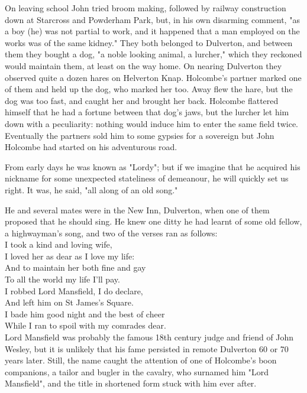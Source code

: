On leaving school John tried broom making, followed by railway construction down at Starcross and Powderham Park, but, in his own disarming comment, "as a boy (he) was not partial to work, and it happened that a man employed on the works was of the same kidney." They both belonged to Dulverton, and between them they bought a dog, "a noble looking animal, a lurcher," which they reckoned would maintain them, at least on the way home. On nearing Dulverton they observed quite a dozen hares on Helverton Knap. Holcombe's partner marked one of them and held up the dog, who marked her too. Away flew the hare, but the dog was too fast, and caught her and brought her back. Holcombe flattered himself that he had a fortune between that dog's jaws, but the lurcher let him down with a peculiarity: nothing would induce him to enter the same field twice. Eventually the partners sold him to some gypsies for a sovereign   but John Holcombe had started on his adventurous road.

From early days he was known as "Lordy"; but if we imagine that he acquired his nickname for some unexpected stateliness of demeanour, he will quickly set us right. It was, he said, "all along of an old song."

He and several mates were in the New Inn, Dulverton, when one of them proposed that he should sing. He knew one ditty he had learnt of some old fellow, a highwayman's song, and two of the verses ran as follows: \\

 I took a kind and loving wife, \\
 I loved her as dear as I love my life:\\
 And to maintain her both fine and gay\\
 To all the world my life I'll pay.\\

 I robbed Lord Mansfield, I do declare,\\
 And left him on St James's Square.\\
 I bade him good night and the best of cheer\\
 While I ran to spoil with my comrades dear.\\
 
Lord Mansfield was probably the famous 18th century judge and friend of John Wesley, but it is unlikely that his fame persisted in remote Dulverton 60 or 70 years later. Still, the name caught the attention of one of Holcombe's boon companions, a tailor and bugler in the cavalry, who surnamed him "Lord Mansfield", and the title in shortened form stuck with him ever after.

